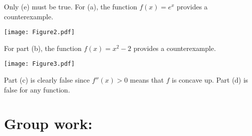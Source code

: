 \documentclass[nooutcomes]{ximera}
\begin{document}
\begin{enumerate}
\begin{enumerate}
		\end{enumerate}

			\begin{freeResponse}
			Only (e) must be true.  For (a), the function $f(x) = e^x$ provides a counterexample.
			
			\begin{image}
			\texttt{[image: Figure2.pdf]}
			\end{image}
			
			For part (b), the function $f(x) = x^2 -2$ provides a counterexample.
			
			\begin{image}
			\texttt{[image: Figure3.pdf]}
			\end{image}
			
			Part (c) is clearly false since $f''(x) > 0$ means that $f$ is concave up.  Part (d) is false for any function.
			
			\end{freeResponse}	
		
		
		
	\end{enumerate}
		
		
		

	
	
	
	
	

\section*{Group work:}
\end{document}
